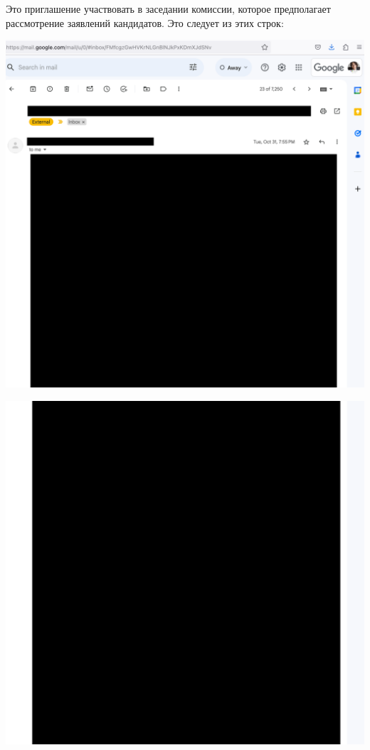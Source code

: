 
Это приглашение участвовать в заседании комиссии,
которое предполагает рассмотрение заявлений кандидатов.
Это следует из этих строк: \Quote{%
    <\dots>%
}

\begin{center}
    \includegraphics[width=40em]{invitation-p1_public}
\end{center}
\WillContinue
\pagebreak

\Continuing
\begin{center}
    \includegraphics[width=40em]{invitation-p2_public}
\end{center}

\pagebreak
